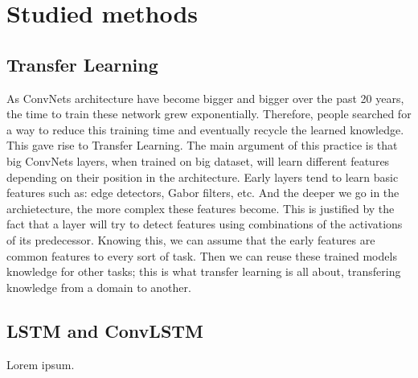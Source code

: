 \documentclass[12pt, a4paper]{report}
\begin{document}
		\section{Studied methods}
			\subsection{Transfer Learning}
				As ConvNets architecture have become bigger and bigger over the past 20 years, the time to train these network grew exponentially.
				Therefore, people searched for a way to reduce this training time and eventually recycle the learned knowledge.
				This gave rise to Transfer Learning.
				The main argument of this practice is that big ConvNets layers, when trained on big dataset, will learn different features depending on their position in the architecture.
				Early layers tend to learn basic features such as: edge detectors, Gabor filters, etc.
				And the deeper we go in the archietecture, the more complex these features become.
				This is justified by the fact that a layer will try to detect features using combinations of the activations of its predecessor.
				Knowing this, we can assume that the early features are common features to every sort of task.
				Then we can reuse these trained models knowledge for other tasks; this is what transfer learning is all about, transfering knowledge from a domain to another.
				
			
			\subsection{LSTM and ConvLSTM}
				Lorem ipsum.
			
\end{document}
